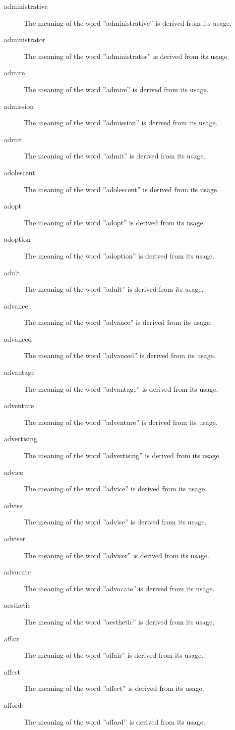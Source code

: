 \documentclass[12pt, letterpaper]{memoir}
\begin{document}
\begin{description}
\item[administrative] The meaning of the word ''administrative'' is derived from its usage.
\item[administrator] The meaning of the word ''administrator'' is derived from its usage.
\item[admire] The meaning of the word ''admire'' is derived from its usage.
\item[admission] The meaning of the word ''admission'' is derived from its usage.
\item[admit] The meaning of the word ''admit'' is derived from its usage.
\item[adolescent] The meaning of the word ''adolescent'' is derived from its usage.
\item[adopt] The meaning of the word ''adopt'' is derived from its usage.
\item[adoption] The meaning of the word ''adoption'' is derived from its usage.
\item[adult] The meaning of the word ''adult'' is derived from its usage.
\item[advance] The meaning of the word ''advance'' is derived from its usage.
\item[advanced] The meaning of the word ''advanced'' is derived from its usage.
\item[advantage] The meaning of the word ''advantage'' is derived from its usage.
\item[adventure] The meaning of the word ''adventure'' is derived from its usage.
\item[advertising] The meaning of the word ''advertising'' is derived from its usage.
\item[advice] The meaning of the word ''advice'' is derived from its usage.
\item[advise] The meaning of the word ''advise'' is derived from its usage.
\item[adviser] The meaning of the word ''adviser'' is derived from its usage.
\item[advocate] The meaning of the word ''advocate'' is derived from its usage.
\item[aesthetic] The meaning of the word ''aesthetic'' is derived from its usage.
\item[affair] The meaning of the word ''affair'' is derived from its usage.
\item[affect] The meaning of the word ''affect'' is derived from its usage.
\item[afford] The meaning of the word ''afford'' is derived from its usage.

\end{description}
\end{document}
